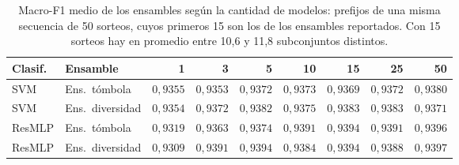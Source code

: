 \begin{table}[H]
\centering\fontsize{8}{10}\selectfont\setlength{\tabcolsep}{3.0pt}
\caption{Macro-F1 medio de los ensambles según la cantidad de modelos: prefijos de una misma secuencia de 50 sorteos, cuyos primeros 15 son los de los ensambles reportados. Con 15 sorteos hay en promedio entre 10,6 y 11,8 subconjuntos distintos.}
\label{tab:sel-size}
\begin{tabular}{@{}llrrrrrrr@{}}
\toprule
Clasif. & Ensamble & 1 & 3 & 5 & 10 & 15 & 25 & 50 \\
\midrule
SVM & Ens.\ tómbola & $0{,}9355$ & $0{,}9353$ & $0{,}9372$ & $0{,}9373$ & $0{,}9369$ & $0{,}9372$ & $0{,}9380$ \\
SVM & Ens.\ diversidad & $0{,}9354$ & $0{,}9372$ & $0{,}9382$ & $0{,}9375$ & $0{,}9383$ & $0{,}9383$ & $0{,}9371$ \\
ResMLP & Ens.\ tómbola & $0{,}9319$ & $0{,}9363$ & $0{,}9374$ & $0{,}9391$ & $0{,}9394$ & $0{,}9391$ & $0{,}9396$ \\
ResMLP & Ens.\ diversidad & $0{,}9309$ & $0{,}9391$ & $0{,}9394$ & $0{,}9384$ & $0{,}9394$ & $0{,}9388$ & $0{,}9397$ \\
\bottomrule
\end{tabular}
\end{table}
